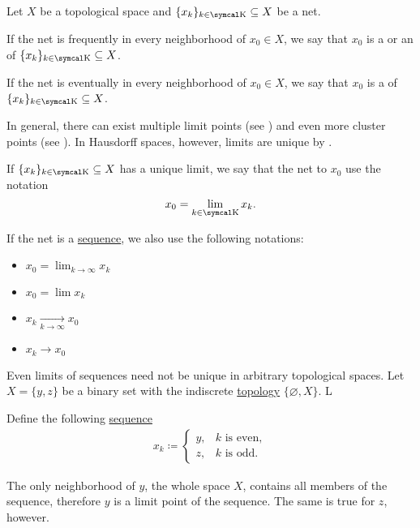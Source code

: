 \begin{Definition}\label{def:net_convergence}
  Let \( X \) be a topological space and \( \{ x_k \}_{k \in \CK} \subseteq X \) be a net.

  \begin{DefEnum}
     If the net is frequently in every neighborhood of \( x_0 \in X \), we say that \( x_0 \) is a  or an  of \( \{ x_k \}_{k \in \CK} \subseteq X \).

     If the net is eventually in every neighborhood of \( x_0 \in X \), we say that \( x_0 \) is a  of \( \{ x_k \}_{k \in \CK} \subseteq X \).
  \end{DefEnum}

  In general, there can exist multiple limit points (see ) and even more cluster points (see ). In Hausdorff spaces, however, limits are unique by .

  If \( \{ x_k \}_{k \in \CK} \subseteq X \) has a unique limit, we say that the net  to \( x_0 \) use the notation
  \begin{equation*}
    x_0 = \lim_{k \in \CK} x_k.
  \end{equation*}

  If the net is a \hyperref[def:sequence]{sequence}, we also use the following notations:
  \begin{itemize}
    \item \( x_0 = \lim_{k \to \infty} x_k \)
    \item \( x_0 = \lim x_k \)
    \item \( x_k \xrightarrow[k \to \infty]{} x_0 \)
    \item \( x_k \to x_0 \)
  \end{itemize}
\end{Definition}

\begin{Example}\label{ex:multiple_limit_points_of_net}
  Even limits of sequences need not be unique in arbitrary topological spaces. Let \( X = \{ y, z \} \) be a binary set with the indiscrete \hyperref[def:standard_topologies/indiscrete]{topology} \( \{ \varnothing, X \} \). L

  Define the following \hyperref[def:sequence]{sequence}
  \begin{align*}
    x_k \coloneqq \begin{cases}
      y, &k \text{ is even}, \\
      z, &k \text{ is odd}.
    \end{cases}
  \end{align*}

  The only neighborhood of \( y \), the whole space \( X \), contains all members of the sequence, therefore \( y \) is a limit point of the sequence. The same is true for \( z \), however.
\end{Example}

